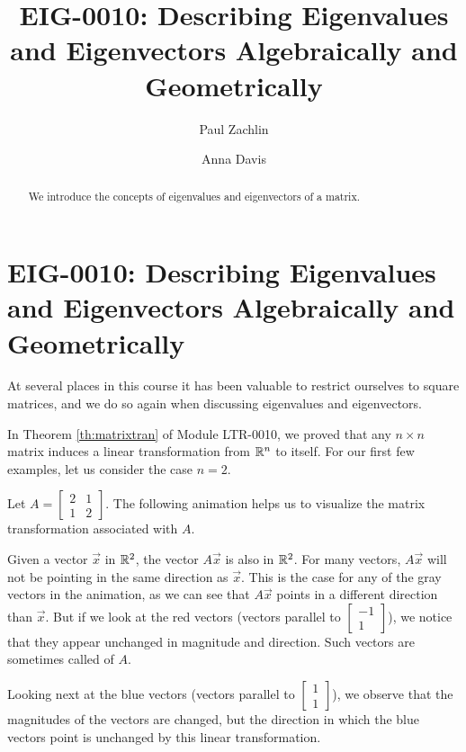 \documentclass{ximera}
\author{Paul Zachlin \and Anna Davis} \title{EIG-0010: Describing Eigenvalues and Eigenvectors Algebraically and Geometrically} \license{CC-BY 4.0}
\begin{document}
\begin{abstract}
 We introduce the concepts of eigenvalues and eigenvectors of a matrix.
\end{abstract}
\maketitle
\section*{EIG-0010: Describing Eigenvalues and Eigenvectors Algebraically and Geometrically}
At several places in this course it has been valuable to restrict ourselves to square matrices, and we do so again when discussing eigenvalues and eigenvectors.  

In Theorem \ref{th:matrixtran} 
of Module LTR-0010, we proved that any $n \times n$  matrix induces a linear transformation from $\mathbb{R}^n$ to itself.  For our first few examples, let us consider the case $n = 2$. 

\begin{exploration}\label{init:eignintro}
Let $A=\begin{bmatrix} 2& 1\\ 1&2
\end{bmatrix}$.  The following animation helps us to visualize the matrix transformation associated with $A$.

\begin{center}
  \end{center}

Given a vector $\vec{x}$ in $\mathbb{R}^2$, the vector $A\vec{x}$ is also in $\mathbb{R}^2$.  For many vectors, $A\vec{x}$ will not be pointing in the same direction as $\vec{x}$.  This is the case for any of the gray vectors in the animation, as we can see that $A\vec{x}$ points in a different direction than $\vec{x}$.  But if we look at the red vectors (vectors parallel to $\begin{bmatrix}-1\\1\end{bmatrix}$), we notice that they appear unchanged in magnitude and direction.  Such vectors are sometimes called  of $A$.

Looking next at the blue vectors (vectors parallel to $\begin{bmatrix}1\\1\end{bmatrix}$), we observe that the magnitudes of the vectors are changed, but the direction in which the blue vectors point is unchanged by this linear transformation.  
\end{exploration}
\end{document}
